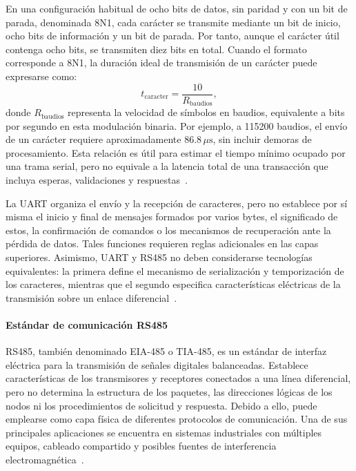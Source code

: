 En una configuración habitual de ocho bits de datos, sin paridad y con un bit de parada, denominada 8N1, cada carácter se transmite mediante un bit de inicio, ocho bits de información y un bit de parada. Por tanto, aunque el carácter útil contenga ocho bits, se transmiten diez bits en total. Cuando el formato corresponde a 8N1, la duración ideal de transmisión de un carácter puede expresarse como:
\begin{equation}
 t_{\mathrm{caracter}}=\frac{10}{R_{\mathrm{baudios}}},
\end{equation}
donde $R_{\mathrm{baudios}}$ representa la velocidad de símbolos en baudios, equivalente a bits por segundo en esta modulación binaria. Por ejemplo, a 115200 baudios, el envío de un carácter requiere aproximadamente $86.8\,\mu\mathrm{s}$, sin incluir demoras de procesamiento. Esta relación es útil para estimar el tiempo mínimo ocupado por una trama serial, pero no equivale a la latencia total de una transacción que incluya esperas, validaciones y respuestas~\cite{pena2020uart}.

La UART organiza el envío y la recepción de caracteres, pero no establece por sí misma el inicio y final de mensajes formados por varios bytes, el significado de estos, la confirmación de comandos o los mecanismos de recuperación ante la pérdida de datos. Tales funciones requieren reglas adicionales en las capas superiores. Asimismo, UART y RS485 no deben considerarse tecnologías equivalentes: la primera define el mecanismo de serialización y temporización de los caracteres, mientras que el segundo especifica características eléctricas de la transmisión sobre un enlace diferencial~\cite{kugelstadt2021rs485,pena2020uart}.

\paragraph{Estándar de comunicación RS485}
RS485, también denominado EIA-485 o TIA-485, es un estándar de interfaz eléctrica para la transmisión de señales digitales balanceadas. Establece características de los transmisores y receptores conectados a una línea diferencial, pero no determina la estructura de los paquetes, las direcciones lógicas de los nodos ni los procedimientos de solicitud y respuesta. Debido a ello, puede emplearse como capa física de diferentes protocolos de comunicación. Una de sus principales aplicaciones se encuentra en sistemas industriales con múltiples equipos, cableado compartido y posibles fuentes de interferencia electromagnética~\cite{kugelstadt2021rs485}.

